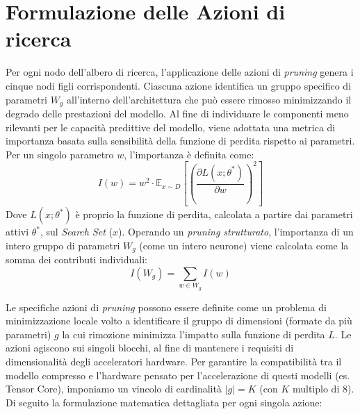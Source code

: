 \section{Formulazione delle Azioni di ricerca}
\label{section:math_actions}
Per ogni nodo dell'albero di ricerca, l'applicazione delle azioni di
\textit{pruning} genera i cinque nodi figli corrispondenti. Ciascuna azione
identifica un gruppo specifico di parametri ${W}_g$ all'interno
dell'architettura che può essere rimosso minimizzando il degrado delle
prestazioni del modello. \newline Al fine di individuare le componenti meno
rilevanti per le capacità predittive del modello, viene adottata una metrica di
importanza basata sulla sensibilità della funzione di perdita rispetto ai
parametri. Per un singolo parametro $w$, l'importanza è definita come:
\begin{equation} \label{eq:metrica_importanza}
    {I}(w) = w^2 \cdot \mathbb{E}_{x \sim {D}} \left[ \left( \frac{\partial {L}(x; \theta^*)}{\partial w} \right)^2 \right]
\end{equation}
Dove ${L}(x; \theta^*)$ è proprio la funzione di perdita, calcolata a partire dai parametri attivi $\theta^*$, sul \textit{Search Set} ($x$).
Operando un \textit{pruning strutturato}, l'importanza di un intero gruppo di parametri ${W}_g$ (come un intero neurone) viene calcolata come la somma dei contributi individuali:
\begin{equation}
    {I}({W}_g) = \sum_{w \in {W}_g} {I}(w)
\end{equation}

Le specifiche azioni di \textit{pruning} possono essere definite come un
problema di minimizzazione locale volto a identificare il gruppo di dimensioni
(formate da più parametri) $g$ la cui rimozione minimizza l'impatto sulla
funzione di perdita ${L}$. Le azioni agiscono sui singoli blocchi, al
fine di mantenere i requisiti di dimensionalità degli acceleratori hardware.
Per garantire la compatibilità tra il modello compresso e l'hardware pensato
per l'accelerazione di questi modelli (es. Tensor Core), imponiamo un vincolo
di cardinalità $|g| = K$ (con $K$ multiplo di 8). Di seguito la formulazione
matematica dettagliata per ogni singola azione:

